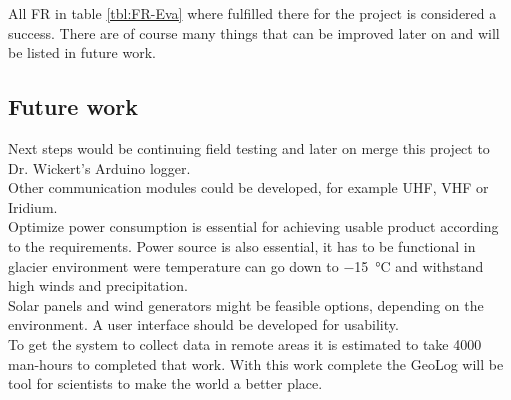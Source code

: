 All FR in table \ref{tbl:FR-Eva} where fulfilled there for the project is considered a success. There are of course many things that can be improved later on and will be listed in future work.

\subsection*{Future work}

Next steps would be continuing field testing and later on merge this project to Dr. Wickert's Arduino logger. \\
Other communication modules could be developed, for example UHF, VHF or Iridium.\\
Optimize power consumption is essential for achieving usable product according to the requirements. Power source is also essential, it has to be functional in glacier environment were temperature can go down to \SI{-15}{\celsius} and withstand high winds and precipitation. \\
Solar panels and wind generators might be feasible options, depending on the environment.  
A user interface should be developed for usability. \\
To get the system to collect data in remote areas it is estimated to take 4000 man-hours to completed that work.
With this work complete the GeoLog will be tool for scientists to make the world a better place.
